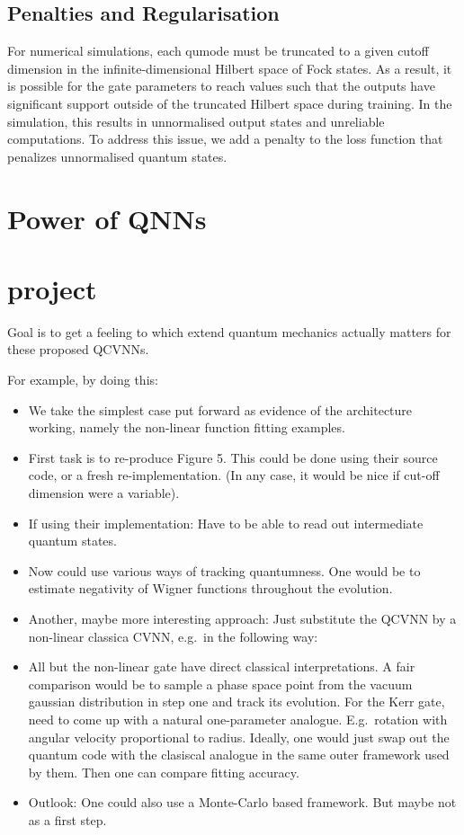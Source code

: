 \documentclass[11pt,oneside]{article}
\theoremstyle{definition}
\theoremstyle{definition}
\begin{document}
\subsection{Penalties and Regularisation}

For numerical simulations, each qumode must be truncated to a given cutoff dimension in the infinite-dimensional Hilbert space of Fock states. As a result, it is possible for the gate parameters to reach values such that the outputs have significant support outside of the truncated Hilbert space during training. In the simulation, this results in unnormalised output states and unreliable computations. To address this issue, we add a penalty to the loss function that penalizes unnormalised quantum states. 

\section{Power of QNNs}

\section{project}

Goal is to get a feeling to which extend quantum mechanics actually matters for these proposed QCVNNs.

For example, by doing this:
\begin{itemize}
	\item
		We take the simplest case put forward as evidence of the architecture working, namely the non-linear function fitting examples.
	\item
		First task is to re-produce Figure 5.
		This could be done using their source code, or a fresh re-implementation.
		(In any case, it would be nice if cut-off dimension were a variable).
	\item
		If using their implementation: Have to be able to read out intermediate quantum states.
	\item
		Now could use various ways of tracking quantumness.
		One would be to estimate negativity of Wigner functions throughout the evolution.
	\item
		Another, maybe more interesting approach:
		Just substitute the QCVNN by a non-linear classica CVNN, e.g.\ in the following way:
	\item
		All but the non-linear gate have direct classical interpretations. 
		A fair comparison would be to sample a phase space point from the vacuum gaussian distribution in step one and track its evolution.
		For the Kerr gate, need to come up with a natural one-parameter analogue.
		E.g.\ rotation with angular velocity proportional to radius.
		Ideally, one would just swap out the quantum code with the clasiscal analogue in the same outer framework used by them.
		Then one can compare fitting accuracy.
	\item
		Outlook: One could also use a Monte-Carlo based framework. But maybe not as a first step.
\end{itemize}
\end{document}
